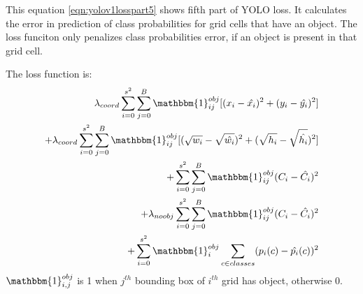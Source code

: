                 This equation \ref{eqn:yolov1losspart5} shows fifth part of YOLO loss. It calculates the error in prediction of class probabilities for grid cells that have an object. The loss funciton only penalizes class probabilities error, if an object is present in that grid cell.

                The loss function is:
                \begin{equation}
                    \begin{split}
                        \lambda_{coord} \sum_{i=0}^{s^2} \sum_{j=0}^{B} \mathbbm{1}_{i j}^{obj} [(x_i-\hat{x_i})^2 + (y_i - \hat{y_i})^2] \\
                        + \lambda_{coord} \sum_{i=0}^{s^2} \sum_{j=0}^{B} \mathbbm{1}_{i j}^{obj} [(\sqrt{w_i}-\sqrt{\hat{w_i}})^2 + (\sqrt{h_i} - \sqrt{\hat{h_i}})^2] \\ 
                        + \sum_{i=0}^{s^2} \sum_{j=0}^{B} \mathbbm{1}_{i j}^{obj} (C_i-\hat{C_i})^2 \\ 
                        + \lambda_{noobj}  \sum_{i=0}^{s^2} \sum_{j=0}^{B} \mathbbm{1}_{i j}^{obj} (C_i-\hat{C_i})^2 \\ 
                        + \sum_{i=0}^{s^2} \mathbbm{1}_{i}^{obj} \sum_{c \in classes } (p_i(c)-\hat{p_i}(c))^2
                    \end{split}
                \end{equation}
                $ \mathbbm{1}_{i,j}^{obj} $  is 1 when $j^{th}$ bounding box of $i^{th} $ grid has object, otherwise 0.
                \pagebreak
